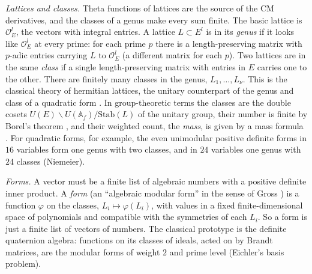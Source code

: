 \documentclass[11pt]{amsart}
\numberwithin{equation}{section}
\theoremstyle{definition}
\theoremstyle{remark}
\newcommand{\cO}{\mathcal O}
\begin{document}
\emph{Lattices and classes.} Theta functions of lattices are the source of the CM derivatives, and the classes of a genus make every sum finite. The basic lattice is $\cO_E^l$, the vectors with integral entries. A lattice $L\subset E^l$ is in its \emph{genus} if it looks like $\cO_E^l$ at every prime: for each prime $p$ there is a length-preserving matrix with $p$-adic entries carrying $L$ to $\cO_E^l$ (a different matrix for each $p$). Two lattices are in the same \emph{class} if a single length-preserving matrix with entries in $E$ carries one to the other. There are finitely many classes in the genus, $L_1,\dots,L_\nu$. This is the classical theory of hermitian lattices, the unitary counterpart of the genus and class of a quadratic form \cite{jacobowitz,shimura}. In group-theoretic terms the classes are the double cosets $U(E)\backslash U(\mathbb A_f)/\mathrm{Stab}(L)$ of the unitary group, their number is finite by Borel's theorem \cite{borel}, and their weighted count, the \emph{mass}, is given by a mass formula \cite{GHY}. For quadratic forms, for example, the even unimodular positive definite forms in $16$ variables form one genus with two classes, and in $24$ variables one genus with $24$ classes (Niemeier).

\emph{Forms.} A vector must be a finite list of algebraic numbers with a positive definite inner product. A \emph{form} (an ``algebraic modular form'' in the sense of Gross \cite{gross}) is a function $\varphi$ on the classes, $L_i\mapsto\varphi(L_i)$, with values in a fixed finite-dimensional space of polynomials and compatible with the symmetries of each $L_i$. So a form is just a finite list of vectors of numbers. The classical prototype is the definite quaternion algebra: functions on its classes of ideals, acted on by Brandt matrices, are the modular forms of weight $2$ and prime level (Eichler's basis problem).
\end{document}
